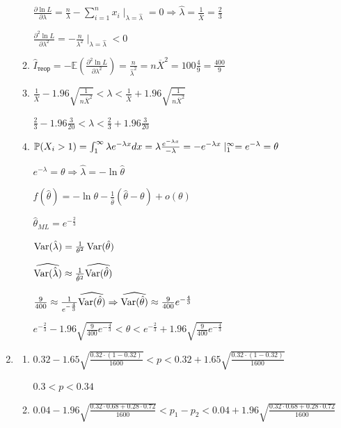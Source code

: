 \documentclass[12pt, a4paper]{article}\usepackage[]{graphicx}\usepackage[]{color}
\begin{document}
\begin{enumerate}
\begin{enumerate}
			$ \frac{\partial \ln L}{\partial \lambda} = \frac{n}{\lambda} - \sum_{i=1}^n x_i \mid_{\lambda = \hat{\lambda}} =0 \Rightarrow \hat{\lambda} = \frac{1}{\overline{X}} = \frac{2}{3} $
				
			$ \frac{\partial^2 \ln L}{\partial \lambda^2} = -\frac{n}{\lambda^2} \mid_{\lambda = \hat{\lambda}} < 0  $
			\item $\hat{I}_{\textbf{теор}} = -\mathbb{E} \left( \frac{\partial^2 \ln L}{\partial \lambda^2}  \right) = \frac{n}{\hat{\lambda}^2} = n \overline{X}^2 = 100 \frac{4}{9} = \frac{400}{9}$
			\item $ \frac{1}{\overline{X}} - 1.96 \sqrt{\frac{1}{n \overline{X}^2}} < \lambda < \frac{1}{\overline{X}} + 1.96 \sqrt{\frac{1}{n \overline{X}^2}} $
			
			$\frac{2}{3} - 1.96 \frac{3}{20} < \lambda < \frac{2}{3} + 1.96 \frac{3}{20}$
			\item $\P(X_i > 1) = \int_{1}^{\infty} \lambda e^{-\lambda x} dx = \lambda \frac{e^{-\lambda x}}{-\lambda} = -e^{-\lambda x} \mid^\infty_1 = e^{-\lambda} = \theta$
			
			$e^{-\lambda} = \theta \Rightarrow \hat{\lambda} = -\ln \hat{\theta}$
			
			$f(\hat{\theta}) = -\ln \theta - \frac{1}{\hat{\theta}} (\hat{\theta} - \theta) + o(\theta)$
			
			$\hat{\theta}_{ML} = e^{-\frac{2}{3}}$
			
			$\Var(\hat{\lambda}) = \frac{1}{\theta^2} \Var(\hat{\theta})$
			
			$\widehat{\Var(\hat{\lambda})} \approx \frac{1}{\hat{\theta}^2} \widehat{\Var(\hat{\theta})}$
			
			$\frac{9}{400} \approx \frac{1}{e^{-\frac{4}{3}}} \widehat{\Var(\hat{\theta})} \Rightarrow \widehat{\Var(\hat{\theta})} \approx \frac{9}{400} e^{-\frac{4}{3}} $
			
			$e^{-\frac{2}{3}} - 1.96 \sqrt{\frac{9}{400} e^{-\frac{4}{3}}} < \theta < e^{-\frac{2}{3}} + 1.96 \sqrt{\frac{9}{400} e^{-\frac{4}{3}}} $
		\end{enumerate}
			
	\item
		\begin{enumerate}
			\item $0.32 - 1.65 \sqrt{\frac{0.32\cdot (1-0.32)}{1600}} < p < 0.32 + 1.65 \sqrt{\frac{0.32\cdot (1-0.32)}{1600}}$
			
			$0.3 < p < 0.34$
			
			\item $0.04 -1.96 \sqrt{\frac{0.32\cdot0.68+0.28\cdot0.72}{1600}} < p_1 - p_2 < 0.04 +1.96 \sqrt{\frac{0.32\cdot0.68+0.28\cdot0.72}{1600}} $
			

\end{enumerate}
\end{enumerate}
\end{document}
